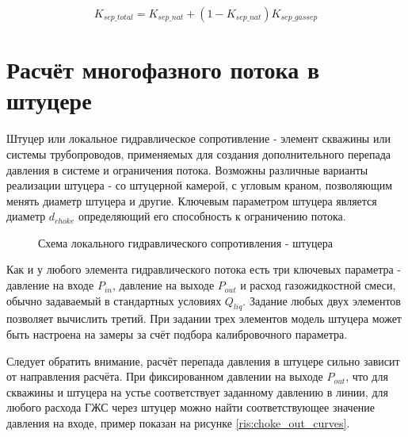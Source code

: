 $$K_{sep\_total} = K_{sep\_nat} + (1-K_{sep\_nat}) K_{sep\_gassep}$$


\section{Расчёт многофазного потока в штуцере}


Штуцер или локальное гидравлическое сопротивление - элемент скважины или системы трубопроводов, применяемых для создания дополнительного перепада давления в системе и ограничения потока. 
Возможны различные варианты реализации штуцера - со штуцерной камерой, с угловым краном, позволяющим менять диаметр штуцера и другие.
Ключевым параметром штуцера является диаметр \(d_{choke} \) определяющий его способность к ограничению потока. 

\begin{figure}[H]
	\begin{center}
	    
		\caption{Схема локального гидравлического сопротивления - штуцера}
		\label{ris:Pipe_choke}
	\end{center}
\end{figure}

Как и у любого элемента гидравлического потока есть три ключевых параметра - давление на входе \( P_{in} \), давление на выходе \(P_{out}\)  и расход газожидкостной смеси, обычно задаваемый в стандартных условиях \(Q_{liq} \). Задание любых двух элементов позволяет вычислить третий. При задании трех элементов модель штуцера может быть настроена на замеры за счёт подбора калибровочного параметра.

Следует обратить внимание, расчёт перепада давления в штуцере сильно зависит от направления расчёта. При фиксированном давлении на выходе $P_{out}$, что для скважины и штуцера на устье соответствует заданному давлению в линии, для любого расхода ГЖС через штуцер можно найти соответствующее значение давления на входе, пример показан на рисунке \ref{ris:choke_out_curves}.
 
